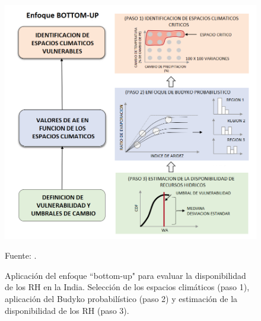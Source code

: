 \begin{figure}[ht!]
	\includegraphics[scale=0.65]{Images/Singh2015.png}
	\centering
	\caption{Aplicación del enfoque “bottom-up" para evaluar la disponibilidad de los RH en la India. Selección de los espacios climáticos (paso 1), aplicación del Budyko probabilístico (paso 2) y estimación de la disponibilidad de los RH (paso 3).}
	Fuente: \citet{Singh2015}.
	\label{fig:Singh2015}
\end{figure}